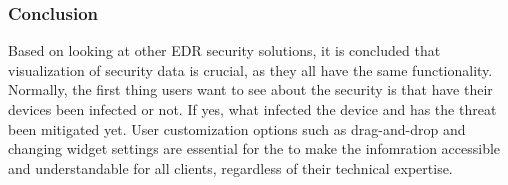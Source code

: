 \subsubsection{Conclusion}

Based on looking at other EDR security solutions, it is concluded that visualization of security data is crucial, as they all have the same
functionality. Normally, the first thing users want to see about the security is that have their devices been infected or not. If yes, what infected
the device and has the threat been mitigated yet. User customization options such as drag-and-drop and changing widget settings
are essential for the to make the infomration accessible and understandable for all clients, regardless of their technical expertise.




